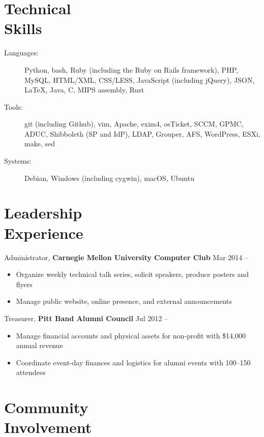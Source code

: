 \documentclass[11pt]{article}
\newcommand{\textdb}[1]{\fontseries{db}\selectfont#1\normalfont}
\newcommand{\present}{\phantom{Xxx 20XX}}
\newcommand{\itemizeonly}{\leavevmode\par\vspace{\dimexpr-\baselineskip-\parskip}}
\begin{document}
\section{Technical\\ Skills}

\itemizeonly
\begin{description}
	\item[\textdb{Languages:}] Python, bash, Ruby (including the Ruby on Rails framework), PHP, MySQL,
		HTML/XML, CSS/LESS, JavaScript (including jQuery), JSON,
		\LaTeX, Java, C, MIPS assembly, Rust
	\item[\textdb{Tools:}] git (including Github), vim, Apache, exim4, osTicket,
		SCCM, GPMC, ADUC, Shibboleth (SP and IdP),
		LDAP, Grouper, AFS, WordPress, ESXi, make, sed
	\item[\textdb{Systems:}] Debian, Windows (including cygwin), macOS, Ubuntu
\end{description}



\section{Leadership\\ Experience}

\textdb{
Administrator,
\textbf{Carnegie Mellon University Computer Club}
	\hfill Mar 2014 -- \present
}
\begin{itemize}
	\item Organize weekly technical talk series, solicit speakers, produce posters and flyers
	\item Manage public website, online presence, and external announcements
\end{itemize}

\textdb{
Treasurer,
\textbf{Pitt Band Alumni Council}
	\hfill Jul 2012 -- \present
}
\begin{itemize}
	\item Manage financial accounts and physical assets
		for non-profit with \$14,000 annual revenue
	\item Coordinate event-day finances and logistics for alumni events with 100--150 attendees
\end{itemize}



\section{Community\\ Involvement}
\end{document}
